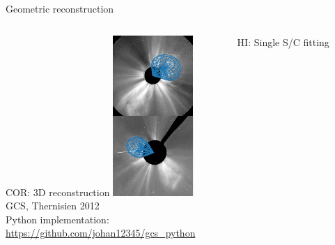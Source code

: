 \documentclass[10pt,aspectratio=169,usenames,dvipsnames]{beamer}
\begin{document}
\begin{frame}{Geometric reconstruction}
    \vskip-2mm
    \begin{columns}[t]
        \begin{column}{0.32\textwidth}
            \begin{block}{COR: 3D reconstruction}
                \centering
                \includegraphics[height=0.65\textheight]{plots/gcs.pdf}\\[-1.5mm]
                {\footnotesize GCS, Thernisien 2012}\\
                {\scriptsize Python implementation:\\[-2mm] \tiny\url{https://github.com/johan12345/gcs_python}}
            \end{block} 
            
        \end{column}
        \begin{column}{0.32\textwidth}
            \begin{block}{HI: Single S/C fitting}     
            \centering
            \vskip1mm
\end{block}
\end{column}
\end{columns}
\end{frame}
\end{document}
